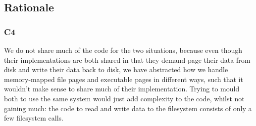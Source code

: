 \documentclass[a4wide, 11pt]{article}
\begin{document}
\subsection{Rationale}
\subsubsection{C4}

We do not share much of the code for the two situations, because even though their implementations are both shared in that they demand-page their data from disk and write their data back to disk, we have abstracted how we handle memory-mapped file pages and executable pages in different ways, such that it wouldn't make sense to share much of their implementation. Trying to mould both to use the same system would just add complexity to the code, whilst not gaining much: the code to read and write data to the filesystem consists of only a few filesystem calls.
\end{document}
